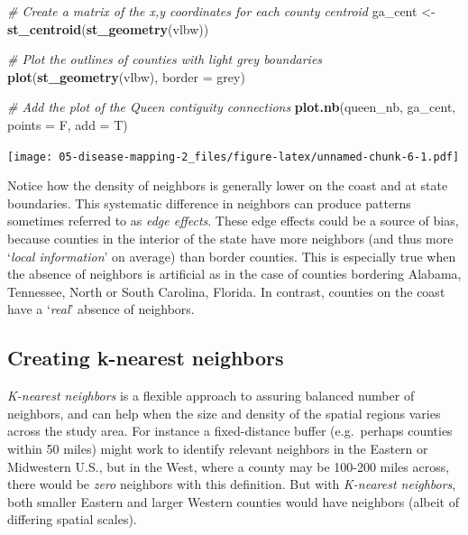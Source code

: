 \documentclass[
]{book}
\newenvironment{Shaded}{\begin{snugshade}}{\end{snugshade}}
\newcommand{\AttributeTok}[1]{\textcolor[rgb]{0.13,0.29,0.53}{#1}}
\newcommand{\CommentTok}[1]{\textcolor[rgb]{0.56,0.35,0.01}{\textit{#1}}}
\newcommand{\FunctionTok}[1]{\textcolor[rgb]{0.13,0.29,0.53}{\textbf{#1}}}
\newcommand{\NormalTok}[1]{#1}
\newcommand{\OtherTok}[1]{\textcolor[rgb]{0.56,0.35,0.01}{#1}}
\newcommand{\StringTok}[1]{\textcolor[rgb]{0.31,0.60,0.02}{#1}}
\begin{document}
\begin{Shaded}
\begin{Highlighting}[]
\CommentTok{\# Create a matrix of the x,y coordinates for each county centroid}
\NormalTok{ga\_cent }\OtherTok{\textless{}{-}} \FunctionTok{st\_centroid}\NormalTok{(}\FunctionTok{st\_geometry}\NormalTok{(vlbw))}

\CommentTok{\# Plot the outlines of counties with light grey boundaries}
\FunctionTok{plot}\NormalTok{(}\FunctionTok{st\_geometry}\NormalTok{(vlbw), }\AttributeTok{border =} \StringTok{\textquotesingle{}grey\textquotesingle{}}\NormalTok{)}

\CommentTok{\# Add the plot of the Queen contiguity connections}
\FunctionTok{plot.nb}\NormalTok{(queen\_nb, ga\_cent, }\AttributeTok{points =}\NormalTok{ F, }\AttributeTok{add =}\NormalTok{ T)}
\end{Highlighting}
\end{Shaded}

\texttt{[image: 05-disease-mapping-2\_files/figure-latex/unnamed-chunk-6-1.pdf]}

Notice how the density of neighbors is generally lower on the coast and at state boundaries. This systematic difference in neighbors can produce patterns sometimes referred to as \emph{edge effects}. These edge effects could be a source of bias, because counties in the interior of the state have more neighbors (and thus more `\emph{local information}' on average) than border counties. This is especially true when the absence of neighbors is artificial as in the case of counties bordering Alabama, Tennessee, North or South Carolina, Florida. In contrast, counties on the coast have a `\emph{real}' absence of neighbors.

\hypertarget{creating-k-nearest-neighbors}{%
\subsection{Creating k-nearest neighbors}\label{creating-k-nearest-neighbors}}

\emph{K-nearest neighbors} is a flexible approach to assuring balanced number of neighbors, and can help when the size and density of the spatial regions varies across the study area. For instance a fixed-distance buffer (e.g.~perhaps counties within 50 miles) might work to identify relevant neighbors in the Eastern or Midwestern U.S., but in the West, where a county may be 100-200 miles across, there would be \emph{zero} neighbors with this definition. But with \emph{K-nearest neighbors}, both smaller Eastern and larger Western counties would have neighbors (albeit of differing spatial scales).
\end{document}
